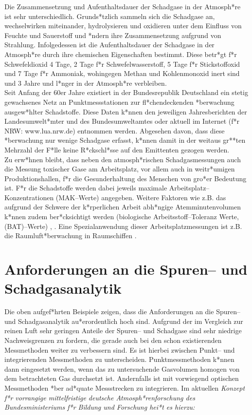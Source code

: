Die Zusammensetzung und Aufenthaltsdauer der Schadgase in der
Atmosph*re ist sehr unterschiedlich. Grunds*tzlich sammeln sich
die Schadgase an, wechselwirken miteinander, hydrolysieren und
oxidieren unter dem Einfluss von Feuchte und Sauerstoff und *ndern
ihre Zusammensetzung aufgrund von Strahlung. Infolgedessen ist die
Aufenthaltsdauer der Schadgase in der Atmosph*re durch ihre
chemischen Eigenschaften bestimmt. Diese betr*gt f*r
Schwefeldioxid 4 Tage, 2 Tage f*r Schwefelwasserstoff, 5 Tage f*r
Stickstoffoxid und 7 Tage f*r Ammoniak, wohingegen Methan und
Kohlenmonoxid inert sind und 3 Jahre und l*nger in der Atmosph*re
verbleiben.\\

Seit Anfang der 60er Jahre existiert in der Bundesrepublik
Deutschland ein stetig gewachsenes Netz an Punktmessstationen zur
fl*chendeckenden *berwachung ausgew*hlter Schadstoffe. Diese Daten
k*nnen den jeweiligen Jahresberichten der Landesumwelt*mter und
des Bundesumweltamtes oder aktuell im Internet (f*r NRW:
www.lua.nrw.de) entnommen werden. Abgesehen davon, dass diese
*berwachung nur wenige Schadgase erfasst, k*nnen damit in der
weitaus gr**ten Mehrzahl der F*lle keine R*ckschl*sse auf den
Emittenten gezogen werden.\\

Zu erw*hnen bleibt, dass neben den atmosph*rischen
Schadgasmessungen auch die Messung toxischer Gase am Arbeitsplatz,
vor allem auch in weitr*umigen Produktionshallen, f*r die
Gesunderhaltung des Menschen von gro*er Bedeutung ist. F*r die
Schadstoffe werden dabei jeweils maximale
Arbeitsplatz--Konzentrationen (MAK--Werte) angegeben. Weitere
Faktoren wie z.B. das aufgrund der Schwere der k*rperlichen Arbeit
abh*ngige Atemminutenvolumen k*nnen zudem ber*cksichtigt werden
(biologische Arbeitsstoff--Toleranz Werte, (BAT)--Werte)
\cite{dfg99}, \cite{heise96}. Eine Spezialanwendung dieser
Arbeitsplatzmessungen ist z.B. die Raumluft*berwachung in
Raumschiffen \cite{johansen97}.\\


\section{\label{anforderungen}Anforderungen an die
Spuren-- und Schadgasanalytik}

Die oben aufgef*hrten Beispiele zeigen, dass die Anforderungen an
die Spuren-- und Schadgasanalytik au*erordentlich hoch sind.
Aufgrund der im Vergleich zur reinen Luft sehr geringen Anteile
der Spuren-- und Schadgase sind sehr niedrige Nachweisgrenzen zu
fordern, die gerade auch bei den schon existierenden Messmethoden
weiter zu verbessern sind. Es ist hierbei zwischen Punkt-- und
integrierenden Messmethoden zu unterscheiden. Punktmessmethoden
k*nnen dann eingesetzt werden, wenn das zu untersuchende
Gasvolumen homogen von dem betrachteten Gas durchsetzt ist.
Andernfalls ist mit vorwiegend optischen Messmethoden *ber
ad*quate Messstrecken zu integrieren. Im aktuellen \it Konzept f*r
vorrangige mittelfristige deutsche Atmosph*renforschung \rm des
Bundesministeriums f*r Bildung und Forschung \cite{bmbf99} hei*t
es hierzu:\

